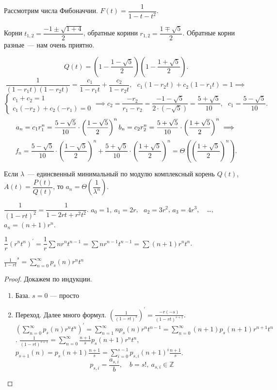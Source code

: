 \begin{example}
    Рассмотрим числа Фибоначчии. $F(t) = \dfrac{1}{1 - t -t^2}$.
    

    Корни $t_{1,2} = \dfrac{-1\pm\sqrt{1 + 4}}{2}$, обратные корини $r_{1, 2} = \dfrac{1\mp \sqrt{5}}{2}$.
    Обратные корни разные~--- нам очень приятно.

    \[Q(t) = \left( 1 - \dfrac{1-\sqrt{5}}{2}\right) \left( 1 - \dfrac{1+\sqrt{5}}{2}\right).
    \]\[
        \dfrac{1}{(1 - r_1 t ) (1 - r_2 t)} = \dfrac{c_1}{1 - r_1 t} + \dfrac{c_2}{1 - r_2 t},~~~
        c_1(1 - r_2 t) + c_2(1 - r_1 t) = 1 \implies
    \]\[
        \begin{cases}
            c_1 + c_2 = 1\\
            c_1(-r_2) + c_2(-r_1) = 0
        \end{cases} \implies
        c_2 = \dfrac{-r_2}{r_1 - r_2} = \dfrac{-1-\sqrt{5}}{2 \cdot(-\sqrt{5})} 
        = \dfrac{5 + \sqrt{5}}{10},~~~
        c_1 = \dfrac{5 - \sqrt{5}}{10}.
    \]\[
        a_n = c_1 r_1^n = \dfrac{5-\sqrt{5}}{10} \cdot \left( \dfrac{1-\sqrt{5}}{2}\right)^n\\
        b_n = c_2 r_2^n = \dfrac{5+\sqrt{5}}{10} \cdot \left( \dfrac{1+\sqrt{5}}{2}\right)^n \implies
    \]\[
       f_n = \dfrac{5 - \sqrt{5}}{10} \cdot \left(\dfrac{1-\sqrt{5}}{2}\right)^n +
       \dfrac{5 + \sqrt{5}}{10} \cdot \left(\dfrac{1+\sqrt{5}}{2}\right)^n =
       \Theta \left( \left( \dfrac{1 + \sqrt{5}}{2}\right)^n \right).
    \]
\end{example}

\begin{remark}
    Если $\lambda$~--- единсвенный минимальный по модулю комплексный корень $Q(t)$,
    $A(t) = \dfrac{P(t)}{Q(t)}$, то $a_n = \Theta \left( \dfrac{1}{\lambda^n} \right)$.
\end{remark}

$\dfrac{1}{(1 - rt)^2} = \dfrac{1}{1 - 2rt +r^2 t^2}$. $a_0 = 1, ~a_1 = 2r$,~
$a_2 = 3 r^2$, $a_3 = 4r^3$, ~ \ldots, $a_n = (n + 1) r^n$.

$\dfrac{1}{r} \left( r^n t^n \right)^\prime = 
\dfrac{1}{r} \sum n r^n t^{n - 1} = \sum n r^{n-1} t^{n-1} = \sum (n + 1) r^n t^n$.

\begin{lemma}
    $\frac{1}{1-rt}^s = \sum_{n=0}^\infty p_s(n)r^nt^n$
\end{lemma}
\begin{proof}
    Докажем по индукции. 
    \begin{enumerate}
        \item База. $s = 0$ --- просто
        \item Переход. Далее много формул.
        $\left( \frac{1}{(1-rt)^s} \right)^\prime = \frac{-r(-s)}{(1-rt)^{s+1}}$.
        $\left( \sum_{n=0}^\infty p_s(n)r^nt^n \right)^\prime = \sum_{n=1}^\infty np_s(n)r^nt^{n-1} = 
        \sum_{n=0}^\infty (n+1)p_s(n+1)r^{n+1}t^n$.
        $\frac{1}{(1-rt)^{s+1}} = \sum_{n=0}^\infty \frac{n+1}{s}p_s(n+1)r^nt^n$,
        $p_{s+1}(n) = p_s(n+1)\frac{n+1}{s} = \sum_{i=0}^{s-1} p_{s,i} (n+1)^i \frac{n+1}{s}$.
        \[ p_{s,i} = \frac{a_{s,i}}{b},\quad b=s!,\ a_{s,i}\in \mathbb{Z} \] 
    \end{enumerate}
\end{proof}

